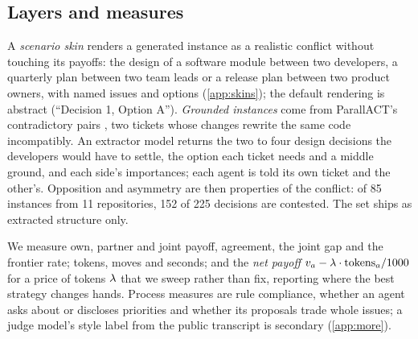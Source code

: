 \subsection{Layers and measures}
\label{sec:layers}
A \emph{scenario skin} renders a generated instance as a realistic conflict without touching its payoffs: the design of a software module between two developers, a quarterly plan between two team leads or a release plan between two product owners, with named issues and options (\cref{app:skins}); the default rendering is abstract (``Decision 1, Option A''). \emph{Grounded instances} come from ParallACT's contradictory pairs \citep{parallact}, two tickets whose changes rewrite the same code incompatibly. An extractor model returns the two to four design decisions the developers would have to settle, the option each ticket needs and a middle ground, and each side's importances; each agent is told its own ticket and the other's. Opposition and asymmetry are then properties of the conflict: of 85 instances from 11 repositories, 152 of 225 decisions are contested. The set ships as extracted structure only.

We measure own, partner and joint payoff, agreement, the joint gap and the frontier rate; tokens, moves and seconds; and the \emph{net payoff} $v_a - \lambda\cdot\text{tokens}_a/1000$ for a price of tokens $\lambda$ that we sweep rather than fix, reporting where the best strategy changes hands. Process measures are rule compliance, whether an agent asks about or discloses priorities and whether its proposals trade whole issues; a judge model's style label from the public transcript is secondary (\cref{app:more}).

